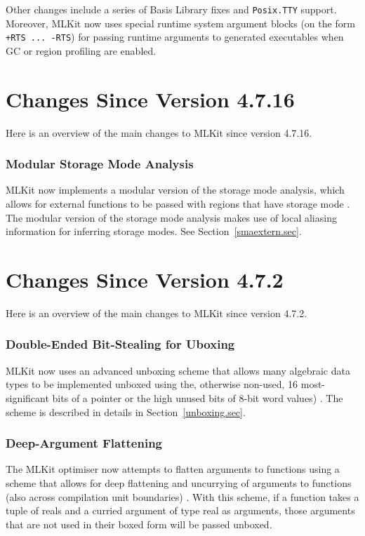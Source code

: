 \documentclass[12pt]{book}
\begin{document}
Other changes include a series of Basis Library fixes and \lstinline{Posix.TTY}
support. Moreover, MLKit now uses special runtime system argument blocks (on the
form \lstinline{+RTS ... -RTS}) for passing runtime arguments to generated
executables when GC or region profiling are enabled.

\section{Changes Since Version 4.7.16}
%

Here is an overview of the main changes to MLKit since version 4.7.16.

\subsubsection{Modular Storage Mode Analysis}

MLKit now implements a modular version of the storage mode analysis, which
allows for external functions to be passed with regions that have storage mode
. The modular version of the storage mode analysis makes use of local
aliasing information for inferring storage modes. See Section~\ref{smaextern.sec}.

\section{Changes Since Version 4.7.2}
%

Here is an overview of the main changes to MLKit since version 4.7.2.

\subsubsection{Double-Ended Bit-Stealing for Uboxing}

MLKit now uses an advanced unboxing scheme that allows many algebraic data types
to be implemented unboxed using the, otherwise non-used, 16 most-significant
bits of a pointer or the high unused bits of 8-bit word values)
\cite{10.1145/3674628}. The scheme is described in details in
Section~\ref{unboxing.sec}.

\subsubsection{Deep-Argument Flattening}

The MLKit optimiser now attempts to flatten arguments to functions using a
scheme that allows for deep flattening and uncurrying of arguments to functions
(also across compilation unit boundaries) \cite{deep-elsman25}. With this
scheme, if a function takes a tuple of reals and a curried argument of type real
as arguments, those arguments that are not used in their boxed form will be
passed unboxed.
\end{document}
